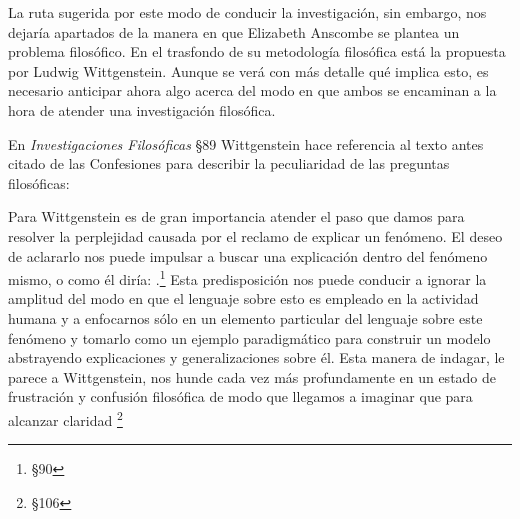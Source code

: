       La ruta sugerida por este modo de conducir la investigación, sin embargo, nos
      dejaría apartados de la manera en que Elizabeth Anscombe se plantea un problema
      filosófico. En el trasfondo de su metodología filosófica está la propuesta por
      Ludwig Wittgenstein. Aunque se verá con más detalle qué implica esto, es
      necesario anticipar ahora algo acerca del modo en que ambos se encaminan a la
      hora de atender una investigación filosófica.

      En \emph{Investigaciones Filosóficas} \S89 Wittgenstein hace referencia al
      texto antes citado de las Confesiones para describir la peculiaridad de las
      preguntas filosóficas:

      Para Wittgenstein es de gran importancia atender el paso que damos para
      resolver la perplejidad causada por el reclamo de explicar un fenómeno. El
      deseo de aclararlo nos puede impulsar a buscar una explicación dentro del
      fenómeno mismo, o como él diría: .\footnote{\S90} Esta predisposición nos puede conducir
      a ignorar la amplitud del modo en que el lenguaje sobre esto es empleado en la
      actividad humana y a enfocarnos sólo en un elemento particular del lenguaje
      sobre este fenómeno y tomarlo como un ejemplo paradigmático para construir un
      modelo abstrayendo explicaciones y generalizaciones sobre él. Esta manera de
      indagar, le parece a Wittgenstein, nos hunde cada vez más profundamente en un
      estado de frustración y confusión filosófica de modo que llegamos a imaginar
      que para alcanzar claridad \footnote{\S106}

